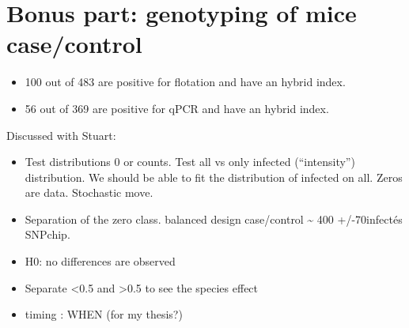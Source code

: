 \documentclass[]{article}
\providecommand{\tightlist}{%
  \setlength{\itemsep}{0pt}\setlength{\parskip}{0pt}}
\begin{document}
\section{Bonus part: genotyping of mice
case/control}\label{bonus-part-genotyping-of-mice-casecontrol}

\begin{itemize}
\item
  100 out of 483 are positive for flotation and have an hybrid index.
\item
  56 out of 369 are positive for qPCR and have an hybrid index.
\end{itemize}

Discussed with Stuart:

\begin{itemize}
\tightlist
\item
  Test distributions 0 or counts. Test all vs only infected
  (``intensity'') distribution. We should be able to fit the
  distribution of infected on all. Zeros are data. Stochastic move.
\item
  Separation of the zero class. balanced design case/control
  \textasciitilde{} 400 +/-70infectés SNPchip.
\item
  H0: no differences are observed
\item
  Separate \textless{}0.5 and \textgreater{}0.5 to see the species
  effect
\item
  timing : WHEN (for my thesis?)
\end{itemize}
\end{document}
